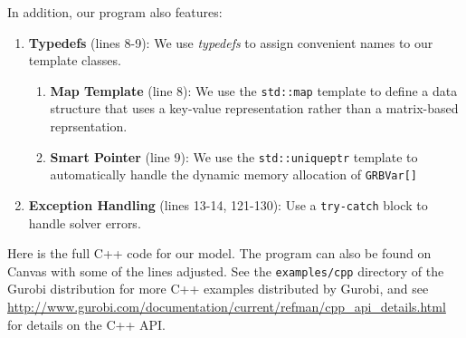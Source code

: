 \documentclass[12pt]{article}
\begin{document}
In addition, our program also features:
\begin{enumerate}
    \item \textbf{Typedefs} (lines 8-9): We use \emph{typedefs} to assign convenient names to our template classes.
        \begin{enumerate}
            \item \textbf{Map Template} (line 8): We use the \texttt{std::map} template to define a data structure that uses a key-value representation rather than a matrix-based reprsentation.
            \item \textbf{Smart Pointer} (line 9): We use the \texttt{std::unique\ttul ptr} template to automatically handle the dynamic memory allocation of \texttt{GRBVar[]}
        \end{enumerate}
    \item \textbf{Exception Handling} (lines 13-14, 121-130): Use a \texttt{try-catch} block to handle solver errors.
\end{enumerate}
Here is the full C++ code for our model. The program can also be found on Canvas with some of the lines adjusted. See the \texttt{examples/cpp} directory of the Gurobi distribution for more C++ examples distributed by Gurobi, and see \url{http://www.gurobi.com/documentation/current/refman/cpp_api_details.html} for details on the C++ API.
\inputminted[fontsize=\small,linenos]{cpp}{code/shortlines/twtgurobi.cpp}
\end{document}

